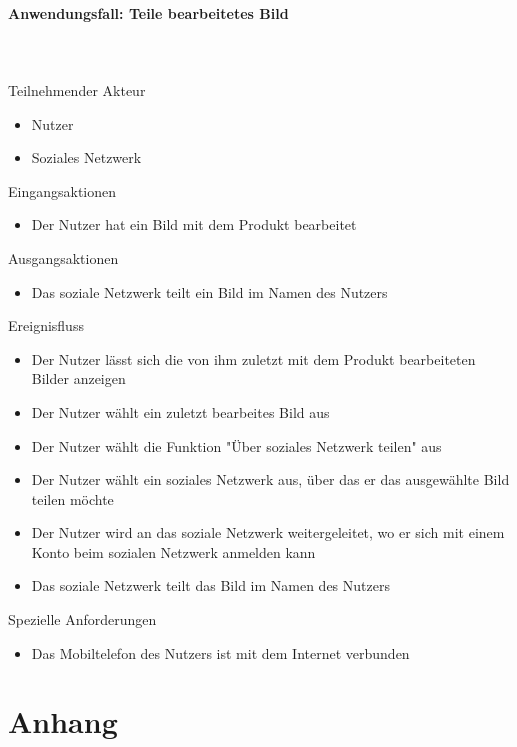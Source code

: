 \documentclass[parskip=full]{scrartcl}
\newcommand{\paragraphashead}[1]{\paragraph{#1}\mbox{}\\\\}
\begin{document}
\paragraphashead{Anwendungsfall: Teile bearbeitetes Bild}
Teilnehmender Akteur
    \begin{itemize}\setlength\itemsep{-1em}
        \item Nutzer
        \item Soziales Netzwerk
    \end{itemize}
Eingangsaktionen
	\begin{itemize}\setlength\itemsep{-1em}
    	\item Der Nutzer hat ein Bild mit dem Produkt bearbeitet
    \end{itemize}
Ausgangsaktionen
	\begin{itemize}\setlength\itemsep{-1em}
        \item Das soziale Netzwerk teilt ein Bild im Namen des Nutzers
    \end{itemize}
Ereignisfluss
	\begin{itemize}\setlength\itemsep{-1em}
    	\item Der Nutzer lässt sich die von ihm zuletzt mit dem Produkt bearbeiteten Bilder anzeigen
        \item Der Nutzer wählt ein zuletzt bearbeites Bild aus
        \item Der Nutzer wählt die Funktion "Über soziales Netzwerk teilen" aus
        \item Der Nutzer wählt ein soziales Netzwerk aus, über das er das ausgewählte Bild teilen möchte
        \item Der Nutzer wird an das soziale Netzwerk weitergeleitet, wo er sich mit einem Konto beim sozialen Netzwerk anmelden kann
        \item Das soziale Netzwerk teilt das Bild im Namen des Nutzers
    \end{itemize}
Spezielle Anforderungen
\begin{itemize}\setlength\itemsep{-1em}
  \item Das Mobiltelefon des Nutzers ist mit dem Internet verbunden
\end{itemize}

\newpage

%
%
\section{Anhang}
\printnoidxglossaries
\end{document}
